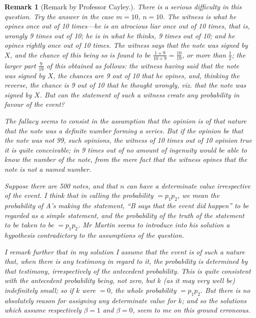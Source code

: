 \documentclass[11pt,a4paper]{book}
\newtheorem*{remark}{Remark}
\begin{document}
\begin{remark}[Remark by Professor Cayley.]
There is a serious difficulty in this question. Try the answer in the case $m=10$, $n=10$. The witness is what he opines once out of 10 times---he is an atrocious liar once out of 10 times, that is, wrongly 9 times out of 10; he is in what he thinks, 9 times out of 10; and he opines rightly once out of 10 times. The witness says that the note was signed by $X$, and the chance of this being so is found to be $\frac{1+9}{10+9} = \frac{10}{19}$, or more than $\frac{1}{2}$; the larger part $\frac{9}{19}$ of this obtained as follows: the witness having said that the note was signed by $X$, the chances are 9 out of 10 that he opines, and, thinking the reverse, the chance is 9 out of 10 that he thought wrongly, viz. that the note was signed by $X$. But can the statement of such a witness create any probability in favour of the event?

The fallacy seems to consist in the assumption that the opinion is of that nature that the note was a definite number forming a series. But if the opinion be that the note was not 99, such opinions, the witness of 10 times out of 10 opinion true it is quite conceivable; in 9 times out of no amount of ingenuity would be able to know the number of the note, from the mere fact that the witness opines that the note is not a named number.

Suppose there are 500 notes, and that $n$ can have a determinate value irrespective of the event. I think that in calling the probability $= p_1p_2$, we mean the probability of A's making the statement, ``B says that the event did happen'' to be regarded as a simple statement, and the probability of the truth of the statement to be taken to be $= p_1p_2$. Mr Martin seems to introduce into his solution a hypothesis contradictory to the assumptions of the question.

I remark further that in my solution I assume that the event is of such a nature that, when there is any testimony in regard to it, the probability is determined by that testimony, irrespectively of the antecedent probability. This is quite consistent with the antecedent probability being, not zero, but $k$ (as it may very well be) indefinitely small; so if $k$ were $=0$, the whole probability $= p_1p_2$. But there is no absolutely reason for assigning any determinate value for $k$; and so the solutions which assume respectively $\beta=1$ and $\beta=0$, seem to me on this ground erroneous.
\end{remark}
\end{document}
